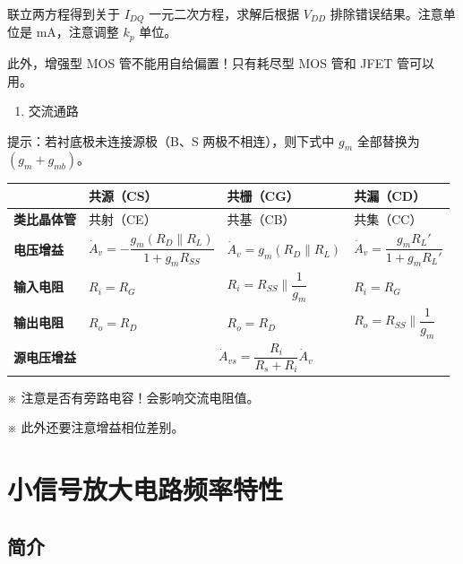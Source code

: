\documentclass[UTF8,fontset=fandol,zihao=5]{ctexart}
\newcommand{\parallelsum}{\mathbin{\|}}
\begin{document}
\begin{methodbox}[【题型】求场效应管直流偏置点]
联立两方程得到关于 $I_{DQ}$ 一元二次方程，求解后根据 $V_{DD}$ 排除错误结果。注意单位是 mA，注意调整 $k_p$ 单位。

此外，增强型 MOS 管不能用自给偏置！只有耗尽型 MOS 管和 JFET 管可以用。
\end{methodbox}

\begin{enumerate}[resume]
  \item 交流通路
\end{enumerate}

提示：若衬底极未连接源极（B、S 两极不相连），则下式中 $g_m$ 全部替换为 $(g_m+g_{mb})$。

\begin{center}
\scriptsize
\renewcommand{\arraystretch}{1.55}
\begin{tabularx}{\textwidth}{>{\bfseries}p{1.8cm}XXX}
\toprule
 & 共源（CS） & 共栅（CG） & 共漏（CD） \\
\midrule
类比晶体管 & 共射（CE） & 共基（CB） & 共集（CC） \\
电压增益 & $\dot A_v=-\dfrac{g_m(R_D\parallelsum R_L)}{1+g_mR_{SS}}$ & $\dot A_v=g_m(R_D\parallelsum R_L)$ & $\dot A_v=\dfrac{g_mR_L'}{1+g_mR_L'}$ \\
输入电阻 & $R_i=R_G$ & $R_i=R_{SS}\parallelsum\dfrac1{g_m}$ & $R_i=R_G$ \\
输出电阻 & $R_o=R_D$ & $R_o=R_D$ & $R_o=R_{SS}\parallelsum\dfrac1{g_m}$ \\
源电压增益 & \multicolumn{3}{c}{$\dot A_{vs}=\dfrac{R_i}{R_s+R_i}\dot A_v$} \\
\bottomrule
\end{tabularx}
\end{center}

※ 注意是否有旁路电容！会影响交流电阻值。

※ 此外还要注意增益相位差别。

\section{小信号放大电路频率特性}

\subsection{简介}
\end{document}
